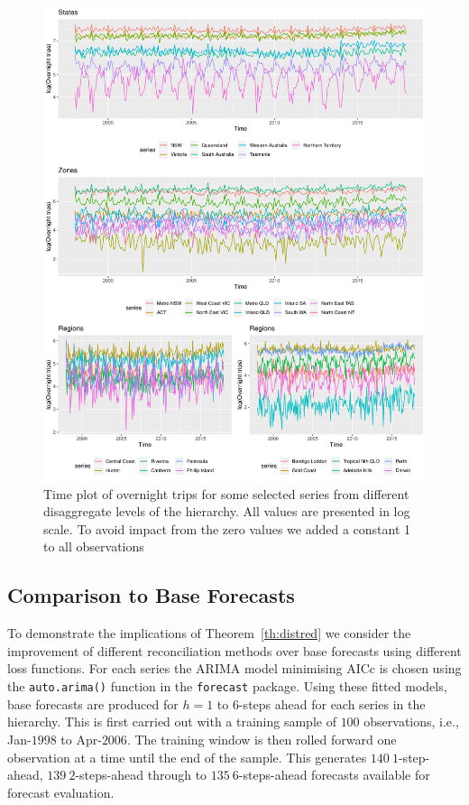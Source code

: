 \documentclass[12pt]{article}
\theoremstyle{definition}
\begin{document}
\begin{figure}
  \centering
  \small
  \includegraphics[width= .95\textwidth]{Empirical-results/TS-plots/States_Zones_Regs_TSplots1.pdf}
  \caption{Time plot of overnight trips for some selected series from different disaggregate levels of the hierarchy. All values are presented in log scale. To avoid impact from the zero values we added a constant 1 to all observations}\label{fig:States_Zones_Regs_TSplots}
\end{figure}



\subsection{Comparison to Base Forecasts}\label{sec:comparebase}

To demonstrate the implications of Theorem~\ref{th:distred} we consider the improvement of different reconciliation methods over base forecasts {\color{blue} using different loss functions}. For each series the ARIMA model minimising AICc is chosen using the \verb|auto.arima()| function in the \verb|forecast| package. Using these fitted models, base forecasts are produced for $h=1$ to $6$-steps ahead for each series in the hierarchy. This is first carried out with a training sample of $100$ observations, i.e., Jan-$1998$ to Apr-$2006$. The training window is then rolled forward one observation at a time until the end of the sample. This generates $140~1$-step-ahead, $139~2$-steps-ahead through to $135~6$-steps-ahead forecasts available for forecast evaluation.
\end{document}
